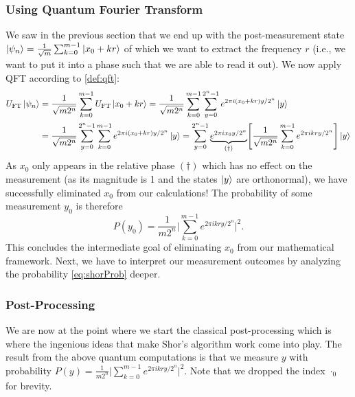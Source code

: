 			\subsubsection{Using Quantum Fourier Transform}
				We saw in the previous section that we end up with the post-measurement state \( \ket{\psi_n} = \frac{1}{\sqrt{m}} \sum_{k = 0}^{m - 1} \ket{x_0 + kr} \) of which we want to extract the frequency \(r\) (i.e., we want to put it into a phase such that we are able to read it out). We now apply \ac{QFT} according to \autoref{def:qft}:
				\begin{align}
					U_\mathrm{FT} \ket{\psi_n}
						&= \frac{1}{\sqrt{m 2^n}} \sum_{k = 0}^{m - 1} U_\mathrm{FT} \ket{x_0 + kr}
						 = \frac{1}{\sqrt{m 2^n}} \sum_{k = 0}^{m - 1} \sum_{y = 0}^{2^n - 1} e^{2 \pi i (x_0 + kr) y / 2^n} \ket{y} \\
						&= \frac{1}{\sqrt{m 2^n}} \sum_{y = 0}^{2^n - 1} \sum_{k = 0}^{m - 1} e^{2 \pi i (x_0 + kr) y / 2^n} \ket{y}
						 = \sum_{y = 0}^{2^n - 1} \underbrace{e^{2 \pi i x_0 y / 2^n}}_{(\dagger)} \Biggl[ \frac{1}{\sqrt{m 2^n}} \sum_{k = 0}^{m - 1} e^{2 \pi i k r y / 2^n} \Biggr] \ket{y}
				\end{align}
				As \(x_0\) only appears in the relative phase \((\dagger)\) which has no effect on the measurement (as its magnitude is \num{1} and the states \(\ket{y}\) are orthonormal), we have successfully eliminated \(x_0\) from our calculations! The probability of some measurement \(y_0\) is therefore
				\begin{equation}
					P(y_0) = \frac{1}{m 2^n} \Biggl\lvert \sum_{k = 0}^{m - 1} e^{2 \pi i k r y / 2^n} \Biggr\rvert^2.  \label{eq:shorProb}
				\end{equation}
				This concludes the intermediate goal of eliminating \(x_0\) from our mathematical framework. Next, we have to interpret our measurement outcomes by analyzing the probability \eqref{eq:shorProb} deeper.

			\subsubsection{Post-Processing}
				We are now at the point where we start the classical post-processing which is where the ingenious ideas that make Shor's algorithm work come into play. The result from the above quantum computations is that we measure \(y\) with probability \( P(y) = \frac{1}{m 2^n} \bigl\lvert \sum_{k = 0}^{m - 1} e^{2 \pi i k r y / 2^n} \bigr\rvert^2 \). Note that we dropped the index \(\cdot_0\) for brevity.

